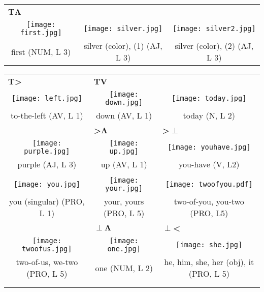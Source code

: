 \documentclass{tufte-book}
\newcommand{\sansnormal}{\sffamily\selectfont}
\begin{document}
\begin{fullwidth}
\begin{table*}[h!]
\begin{tabular}{ccc}
\multicolumn{3}{l}{\textbf{{\sansnormal T}$\mathbf\Lambda$}}\\
\texttt{[image: first.jpg]}& \texttt{[image: silver.jpg]}&\texttt{[image: silver2.jpg]}\\
 first (NUM, L 3) & silver (color), (1) (AJ, L 3) & silver (color), (2) (AJ, L 3)\\
\end{tabular}
\end{table*}
\newpage
\begin{table*}[h!]
\begin{tabular}{ccc}
\multicolumn{1}{l}{\textbf{{\sansnormal T}>}}&\multicolumn{2}{l}{\textbf{{\sansnormal TV}}}\\
\texttt{[image: left.jpg]}& \texttt{[image: down.jpg]}&\texttt{[image: today.jpg]}\\
 to-the-left (AV, L 1) & down (AV, L 1) & today (N, L 2)\\
 \multicolumn{1}{l}{}&\multicolumn{1}{l}{\textbf{>}$\mathbf\Lambda$} & \multicolumn{1}{l}{\textbf{>}$\pmb\perp$}\\%
 \texttt{[image: purple.jpg]}& \texttt{[image: up.jpg]}&\texttt{[image: youhave.jpg]}\\
 purple (AJ, L 3) & up (AV, L 1) & you-have (V, L2)\\%
 \multicolumn{3}{l}{}\\%
  \texttt{[image: you.jpg]}& \texttt{[image: your.jpg]}&\texttt{[image: twoofyou.pdf]}\\
  you (singular) (PRO, L 1) & your, yours (PRO, L 5) & two-of-you, you-two (PRO, L5)\\%
  \multicolumn{1}{l}{}&\multicolumn{1}{l}{$\pmb\perp\mathbf\Lambda$} & \multicolumn{1}{l}{$\pmb\perp$\textbf{<}}\\%
   \texttt{[image: twoofus.jpg]}& \texttt{[image: one.jpg]}&\texttt{[image: she.jpg]}\\
   two-of-us, we-two (PRO, L 5) & one (NUM, L 2) & he, him, she, her (obj), it (PRO, L 5)\\%
    \multicolumn{3}{l}{}\\
    &&\\
    

\end{tabular}
\end{table*}
\end{fullwidth}
\end{document}
